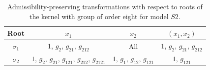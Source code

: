 \begin{table}[H]
	\caption{Admissibility-preserving transformations with respect to roots of the kernel with group of order eight for model $S2$.}
	\label{tbl:Admissibility82}
	\centering
	\begin{tabular}{cccc}
		\toprule
		Root & $x_1$  & $x_2$ & $(x_1,x_2)$ \\
		\midrule
		$\sigma_1$ & $1$, $ g_{2} $, $ g_{21} $, $ g_{212}$ & All & $1$, $ g_{2} $, $ g_{21} $, $ g_{212}$ \\
		$\sigma_2$ & $1$, $ g_{2} $, $ g_{21} $, $ g_{121}$, $ g_{212}$, $ g_{2121}$ & $1$, $ g_{1} $, $ g_{12} $, $ g_{121}$ & $1$, $ g_{121}$ \\
		\bottomrule
	\end{tabular}
\end{table}

